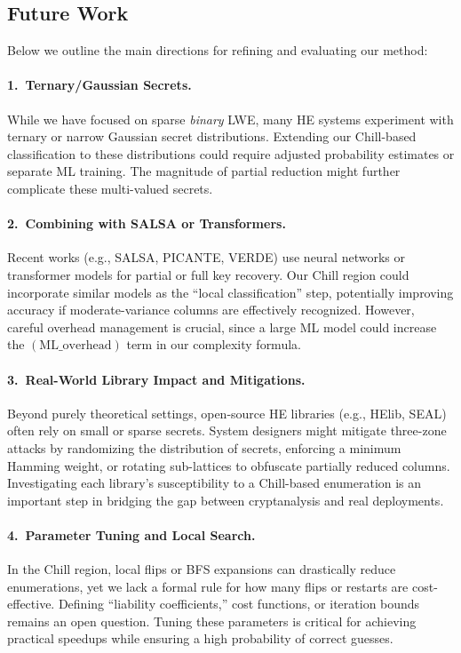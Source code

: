 \documentclass[11pt]{article}
\begin{document}
\subsection{Future Work}
Below we outline the main directions for refining and evaluating our method:

\paragraph{1.\ Ternary/Gaussian Secrets.}
While we have focused on sparse \emph{binary} LWE, many HE systems experiment with ternary or narrow Gaussian secret distributions. Extending our Chill-based classification to these distributions could require adjusted probability estimates or separate ML training. The magnitude of partial reduction might further complicate these multi-valued secrets.

\paragraph{2.\ Combining with SALSA or Transformers.}
Recent works (e.g., SALSA, PICANTE, VERDE) use neural networks or transformer models for partial or full key recovery. Our Chill region could incorporate similar models as the “local classification” step, potentially improving accuracy if moderate-variance columns are effectively recognized. However, careful overhead management is crucial, since a large ML model could increase the $(\mathrm{ML\_overhead})$ term in our complexity formula.

\paragraph{3.\ Real-World Library Impact and Mitigations.}
Beyond purely theoretical settings, open-source HE libraries (e.g., HElib, SEAL) often rely on small or sparse secrets. System designers might mitigate three-zone attacks by randomizing the distribution of secrets, enforcing a minimum Hamming weight, or rotating sub-lattices to obfuscate partially reduced columns. Investigating each library’s susceptibility to a Chill-based enumeration is an important step in bridging the gap between cryptanalysis and real deployments.

\paragraph{4.\ Parameter Tuning and Local Search.}
In the Chill region, local flips or BFS expansions can drastically reduce enumerations, yet we lack a formal rule for how many flips or restarts are cost-effective. Defining “liability coefficients,” cost functions, or iteration bounds remains an open question. Tuning these parameters is critical for achieving practical speedups while ensuring a high probability of correct guesses.
\end{document}
